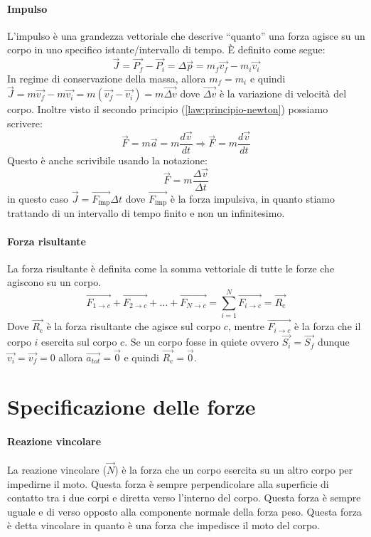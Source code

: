     \paragraph{Impulso}
        L'impulso è una grandezza vettoriale che descrive ``quanto'' una forza agisce su un corpo in uno specifico istante/intervallo di tempo. È definito come segue:
        $$
            \vec{J} = \vec{P_f} - \vec{P_i} = \Delta \vec{p} = m_f\vec{v_f} - m_i\vec{v_i}
        $$
        In regime di conservazione della massa, allora $m_f=m_i$ e quindi $\vec{J} = m\vec{v_f} - m\vec{v_i} = m(\vec{v_f} - \vec{v_i}) = m\vec{\Delta v}$ dove $\vec{\Delta v}$ è la variazione di velocità del corpo.\newline
        Inoltre visto il secondo principio (\ref{law:principio-newton}) possiamo scrivere:
        $$
            \vec{F} = m\vec{a} = m\frac{d\vec{v}}{dt} \Rightarrow \vec{F} = m\frac{d\vec{v}}{dt}
        $$
        Questo è anche scrivibile usando la notazione:
        $$
            \vec{F}=m\frac{\Delta \vec{v}}{\Delta t}
        $$
        in questo caso $\vec{J} = \vec{F_{\text{imp}}} \Delta t$ dove $\vec{F_{\text{imp}}}$ è la forza impulsiva, in quanto stiamo trattando di un intervallo di tempo finito e non un infinitesimo.
    \paragraph{Forza risultante}
        La forza risultante è definita come la somma vettoriale di tutte le forze che agiscono su un corpo. $$
            \vec{F_{1\rightarrow c}} + \vec{F_{2\rightarrow c}} + \dots + \vec{F_{N\rightarrow c}} = \sum_{i=1}^{N} \vec{F_{i\rightarrow c}} = \vec{R_{\text{c}}}
        $$
        Dove $\vec{R_{\text{c}}}$ è la forza risultante che agisce sul corpo $c$, mentre $\vec{F_{i\rightarrow c}}$ è la forza che il corpo $i$ esercita sul corpo $c$.\newline
        Se un corpo fosse in quiete ovvero $\vec{S_i} = \vec{S_f}$ dunque $\vec{v_i} = \vec{v_f} = 0$ allora $\vec{a_{tot}} = \vec{0}$ e quindi $\vec{R_{\text{c}}} = \vec{0}$.
\section{Specificazione delle forze}
    \paragraph{Reazione vincolare} La reazione vincolare ($\vec{N}$) è la forza che un corpo esercita su un altro corpo per impedirne il moto. Questa forza è sempre perpendicolare alla superficie di contatto tra i due corpi e diretta verso l'interno del corpo. Questa forza è sempre uguale e di verso opposto alla componente normale della forza peso. Questa forza è detta vincolare in quanto è una forza che impedisce il moto del corpo.
